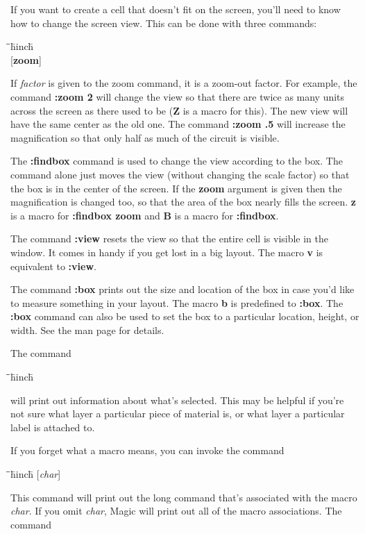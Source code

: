 \documentclass[letterpaper,twoside,12pt]{article}
\def\hinch{\hspace*{0.5in}}
\def\starti{\begin{center}\begin{tabbing}\hinch\=\hinch\=\hinch\=hinch\=\kill}
\def\endi{\end{tabbing}\end{center}}
\def\ii{\>\>\>}
\begin{document}
If you want to create a cell that doesn't fit on the screen,
you'll need to know how to change the screen view.  This
can be done with three commands:

\starti
   \ii {\bfseries :zoom }{\itshape factor} \\
   \ii {\bfseries :findbox }[{\bfseries zoom}] \\
   \ii {\bfseries :view}
\endi

If {\itshape factor} is given to the zoom command, 
it is a zoom-out factor.  For example,
the command {\bfseries :zoom 2} will change the view so that there are
twice as many units across the screen as there used to be ({\bfseries Z}
is a macro for this).  The
new view will have the same center as the old one.  The command
{\bfseries :zoom .5} will increase the magnification so that
only half as much of the circuit is visible.

The {\bfseries :findbox} command is used to change the view according to the box.
The command alone just moves the view (without changing the scale
factor) so that the box is in the center of the screen.  If the {\bfseries zoom}
argument is given then the magnification is changed too, so that the area of
the box nearly fills the screen.  {\bfseries z} is a macro for {\bfseries :findbox zoom}
and {\bfseries B} is a macro for {\bfseries :findbox}.

The command {\bfseries :view} resets the view so that the entire cell is visible
in the window.  It comes in handy if you get lost in a big layout.
The macro {\bfseries v} is equivalent to {\bfseries :view}.

The command {\bfseries :box} prints out the size and location of the box
in case you'd like to measure something in your layout.  The macro
{\bfseries b} is predefined to {\bfseries :box}.  The {\bfseries :box} command can also
be used to set the box to a particular location, height, or
width.  See the man page for details.

The command

\starti
   \ii {\bfseries :what}
\endi

will print out information about what's selected.  This may be helpful
if you're not sure what layer a particular piece of material is, or
what layer a particular label is attached to.

If you forget what a macro means, you can invoke the command

\starti
   \ii {\bfseries :macro }[{\itshape char}]
\endi

This command will print out the long command that's associated
with the macro {\itshape char}.  If you omit {\itshape char}, Magic will
print out all of the macro associations.  The command
\end{document}
